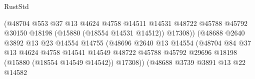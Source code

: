 \begin{lexlean}{RustStd}
\begin{coremodule}
                                              (@48704
                                                @553
                                                @37
                                                @13
                                                @4624
                                                @4758
                                                @14511
                                                @14531
                                                @48722
                                                @45788
                                                @45792
                                                @30150
                                                @18198
                                                (@15880 (@18554 @14531 @14512))
                                                @17308))
                                            (@48688
                                              @2640
                                              @3892
                                              @13
                                              @23
                                              @14554
                                              @14755
                                              (@48696
                                                @2640
                                                @13
                                                @14554
                                                (@48704
                                                  @84
                                                  @37
                                                  @13
                                                  @4624
                                                  @4758
                                                  @14541
                                                  @14549
                                                  @48722
                                                  @45788
                                                  @45792
                                                  @29696
                                                  @18198
                                                  (@15880 (@18554 @14549 @14542))
                                                  @17308))
                                              (@48688
                                                @3739
                                                @3891
                                                @13
                                                @22
                                                @14582

\end{coremodule}
\end{lexlean}
